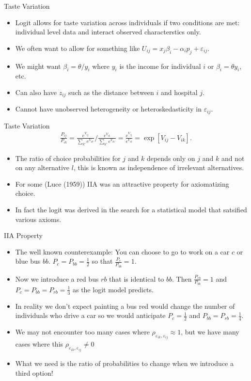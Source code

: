 \documentclass[xcolor=pdftex,dvipsnames,table,mathserif]{beamer}
\begin{document}
\begin{frame}{Taste Variation}
\begin{itemize}
\item Logit allows for taste variation across individuals if two conditions are met: \alert{individual level data} and \alert{interact observed characterstics} only.
\item We often want to allow for something like $U_{ij} = x_{j} \beta_i - \alpha_i p_j + \varepsilon_{ij}$. 
\item We might want $\beta_i = \theta / y_i$ where $y_i$ is the income for individual $i$ or $\beta_i = \theta y_i$, etc.
\item Can also have $z_{ij}$ such as the distance between $i$ and hospital $j$.
\item Cannot have unobserved heterogeneity or heteroskedasticity in $\varepsilon_{ij}$.
\end{itemize}
\end{frame}

\begin{frame}{Taste Variation}
\begin{eqnarray*}
\frac{P_{ij}}{P_{ik}} = \frac{e^{V_{ij}}}{\sum_{k'} e^{V_{ik'}}} / \frac{e^{V_{ik}}}{\sum_{k'} e^{V_{ik'}}} = \frac{e^{V_{ij}}}{e^{V_{ik}}} = \exp[V_{ij} - V_{ik}].
\end{eqnarray*}
\begin{itemize}
\item The ratio of choice probabilities for $j$ and $k$ depends only on $j$ and $k$ and not on any alternative $l$, this is known as \alert{independence of irrelevant alternatives}.
\item For some (Luce (1959)) IIA was an attractive property for axiomatizing choice.
\item In fact the logit was derived in the search for a statistical model that satsified various axioms.
\end{itemize}
\end{frame}

\begin{frame}{IIA Property}
\begin{itemize}
\item The well known counterexample: You can choose to go to work on a car $c$ or blue bus $bb$. $P_{c} = P_{bb} = \frac{1}{2}$ so that $\frac{P_c}{P_{bb}} = 1$.
\item Now we introduce a red bus $rb$ that is identical to $bb$. Then $\frac{P_{rb}}{P_{bb}} = 1$ and $P_{c} = P_{bb}= P_{rb} = \frac{1}{3}$ as the logit model predicts.
\item In reality we don't expect painting a bus red would change the number of individuals who drive a car so we would anticipate $P_{c} = \frac{1}{2}$ and $P_{bb} = P_{rb} = \frac{1}{4}$.
\item We may not encounter too many cases where $\rho_{\varepsilon_{ik},\varepsilon_{ij}} \approx 1$, but we have many cases where this $\rho_{\varepsilon_{ik},\varepsilon_{ij}} \neq 0$
\item What we need is the ratio of probabilities to change when we introduce a third option!
\end{itemize}
\end{frame}
\end{document}
